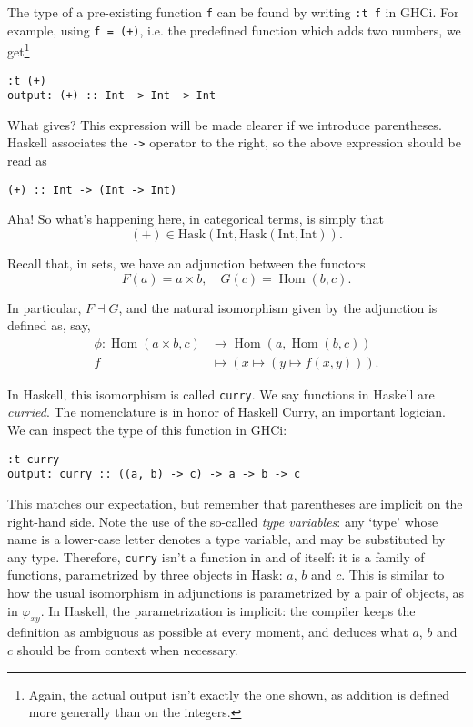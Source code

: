 \documentclass[11pt]{article}
\theoremstyle{nonumberplain}
\newcommand{\Hask}{\mathrm{Hask}}
\newcommand{\type}[1]{\mathrm{#1}}
\DeclareMathOperator{\Hom}{Hom}
\newcommand*\lsin{\lstinline}
\begin{document}
The type of a pre-existing function \lsin|f| can be found by writing \lsin|:t f| in GHCi. For example, using \lsin|f = (+)|, i.e. the predefined function which adds two numbers, we get\footnote{Again, the actual output isn't exactly the one shown, as addition is defined more generally than on the integers.}
\begin{lstlisting}
:t (+)
output: (+) :: Int -> Int -> Int
\end{lstlisting}

What gives? This expression will be made clearer if we introduce parentheses. Haskell associates the \lsin|->| operator to the right, so the above expression should be read as
\begin{lstlisting}
(+) :: Int -> (Int -> Int)
\end{lstlisting}

Aha! So what's happening here, in categorical terms, is simply that
\begin{equation}
(+) \in \Hask(\type{Int}, \Hask(\type{Int}, \type{Int})).
\end{equation}

Recall that, in sets, we have an adjunction between the functors
\begin{equation}
F(a) = a \times b, \quad G(c) = \Hom(b,c).
\end{equation}

In particular, $F \dashv G$, and the natural isomorphism given by the adjunction is defined as, say,
\begin{equation}
\begin{aligned}
\phi \colon \Hom(a \times b, c) &\to \Hom(a, \Hom(b,c))\\
f &\mapsto (x \mapsto (y \mapsto f(x,y))).
\end{aligned}
\end{equation}

In Haskell, this isomorphism is called \lsin|curry|. We say functions in Haskell are \emph{curried}. The nomenclature is in honor of Haskell Curry, an important logician. We can inspect the type of this function in GHCi:
\begin{lstlisting}
:t curry
output: curry :: ((a, b) -> c) -> a -> b -> c
\end{lstlisting}

This matches our expectation, but remember that parentheses are implicit on the right-hand side. Note the use of the so-called \emph{type variables}: any `type' whose name is a lower-case letter denotes a type variable, and may be substituted by any type. Therefore, \lsin|curry| isn't a function in and of itself: it is a family of functions, parametrized by three objects in $\Hask$: $a$, $b$ and $c$. This is similar to how the usual isomorphism in adjunctions is parametrized by a pair of objects, as in $\varphi_{xy}$. In Haskell, the parametrization is implicit: the compiler keeps the definition as ambiguous as possible at every moment, and deduces what $a$, $b$ and $c$ should be from context when necessary.
\end{document}
